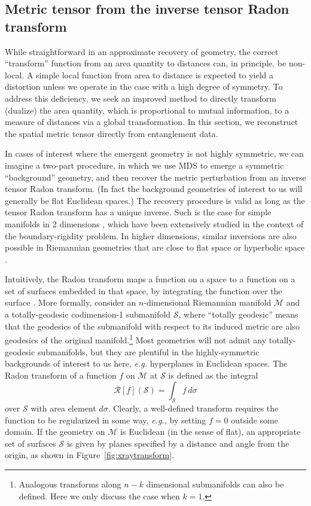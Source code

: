 \documentclass[%
12pt,preprint,
nofootinbib,
amsmath,amssymb,
aps,
prd,
showpacs,
superscriptaddress
]{revtex4-2}
\newcommand{\R}{\mathscr{R}}
\begin{document}
\subsection{Metric tensor from the inverse tensor Radon transform}
\label{sec:metricfromradon}

While straightforward in an approximate recovery of geometry, the correct ``transform'' function from an area quantity to distances can, in principle, be non-local. A simple local function from area to distance is expected to yield a distortion unless we operate in the case with a high degree of symmetry. To address this deficiency, we seek an improved method to directly transform (dualize) the area quantity, which is proportional to mutual information, to a measure of distances via a global transformation. In this section, we reconstruct the spatial metric tensor directly from entanglement data.

In cases of interest where the emergent geometry is not highly symmetric, we can imagine a two-part procedure, in which we use MDS to emerge a symmetric ``background'' geometry, and then recover the metric perturbation from an inverse tensor Radon transform. 
(In fact the background geometries of interest to us will generally be flat Euclidean spaces.)
The recovery procedure is valid as long as the tensor Radon transform has a unique inverse. Such is the case for simple manifolds in 2 dimensions  \cite{BRP2dproof}, which have been extensively studied in the context of the boundary-rigidity problem. In higher dimensions, similar inversions are also possible in Riemannian geometries that are close to flat space or hyperbolic space \cite{uhlmann}.

Intuitively, the Radon transform maps a function on a space to a function on a set of surfaces embedded in that space, by integrating the function over the surface  \cite{helgason1999Radon,sharafutdinov1994integral,Czech:2016tqr}.
More formally, consider an $n$-dimensional Riemannian manifold $\mathcal{M}$ and a totally-geodesic codimension-1 submanifold $\mathcal{S}$, where ``totally geodesic'' means that the geodesics of the submanifold with respect to its induced metric are also geodesics of the original manifold.\footnote{Analogous transforms along $n-k$ dimensional submanifolds can also be defined. Here we only discuss the case when $k=1$.} 
Most geometries will not admit any totally-geodesic submanifolds, but they are plentiful in the highly-symmetric backgrounds of interest to us here, \emph{e.g.} hyperplanes in Euclidean spaces.
The Radon transform of a function $f$ on $\mathcal{M}$ at $\mathcal{S}$ is defined as the integral 
\begin{equation}
\R[f](\mathcal{S}) = \int_{\mathcal{S}} f\, d\sigma
\end{equation}
over $\mathcal{S}$ with area element $d\sigma$. 
Clearly, a well-defined transform requires the function to be regularized in some way, \textit{e.g.,} by setting $f=0$ outside some domain. 
If the geometry on $\mathcal{M}$ is Euclidean (in the sense of flat), an appropriate set of surfaces $\mathcal{S}$ is given by planes specified by a distance and angle from the origin, as shown in Figure~\ref{fig:xraytransform}.
\end{document}
